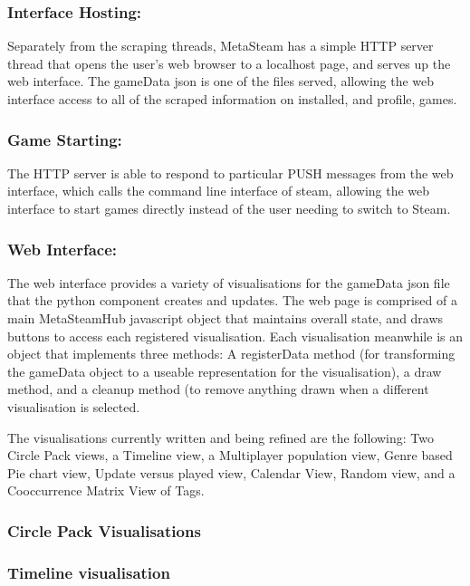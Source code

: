 \documentclass[11pt]{article}
\begin{document}
\subsubsection*{Interface Hosting:}
Separately from the scraping threads, MetaSteam has a simple HTTP server thread that opens the user's web browser to a localhost page, and serves up the web interface. The gameData json is one of the files served, allowing the web interface access to all of the scraped information on installed, and profile, games.

\subsubsection*{Game Starting:}
The HTTP server is able to respond to particular PUSH messages from the web interface, which calls the command line interface of steam, allowing the web interface to start games directly instead of the user needing to switch to Steam.

\subsubsection*{Web Interface:}
The web interface provides a variety of visualisations for the gameData json file that the python component creates and updates. The web page is comprised of a main MetaSteamHub javascript object that maintains overall state, and draws buttons to access each registered visualisation. Each visualisation meanwhile is an object that implements three methods: A registerData method (for transforming the gameData object to a useable representation for the visualisation), a draw method, and a cleanup method (to remove anything drawn when a different visualisation is selected.

The visualisations currently written and being refined are the following: Two Circle Pack views, a Timeline view, a Multiplayer population view, Genre based Pie chart view, Update versus played view, Calendar View, Random view, and a Cooccurrence Matrix View of Tags.

\subsubsection*{Circle Pack Visualisations}

\subsubsection*{Timeline visualisation}
\end{document}
